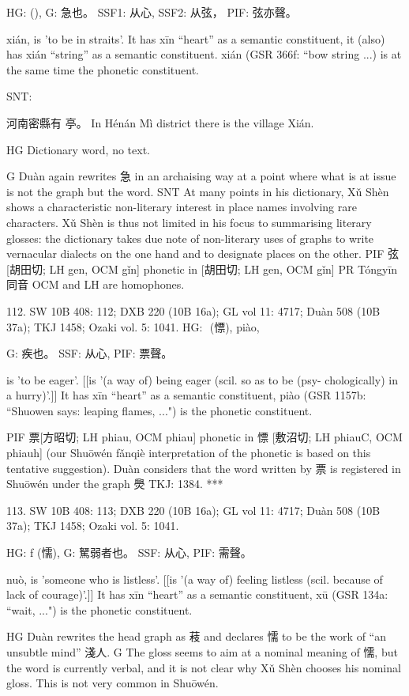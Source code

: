 HG:	(),
G:	急也。
SSF1: 从心,
SSF2: 从弦，
PIF:	弦亦聲。

xián,
is 'to be in straits'.
It has xīn ``heart'' as a semantic constituent,
it (also) has xián ``string'' as a semantic constituent. xián (GSR 366f: ``bow string ...) is at the same time the phonetic constituent.

SNT:

河南密縣有	亭。 In Hénán Mì district there is the village Xián.

HG Dictionary word, no text.



G Duàn again rewrites 急 in an archaising way at a point where what is at issue is not the graph but the word.
SNT At many points in his dictionary, Xǔ Shèn shows a characteristic non-literary interest in place names involving rare characters. Xǔ Shèn is thus not limited in his focus to summarising literary glosses: the dictionary takes due note of non-literary uses of graphs to write vernacular dialects on the one hand and to designate places on the other.
PIF     弦[胡田切; LH gen, OCM gǐn] phonetic in	[胡田切; LH gen, OCM gǐn]
PR	Tóngyīn 同音 OCM and LH are homophones.

112. SW 10B 408: 112; DXB 220 (10B 16a); GL vol 11: 4717; Duàn 508 (10B 37a); TKJ 1458; Ozaki vol. 5: 1041.
HG:  (慓), piào,

G:	疾也。
SSF: 从心,
PIF: 票聲。

is 'to be eager'. [[is '(a way of) being eager (scil. so as to be (psy- chologically) in a hurry)'.]]
It has xīn ``heart'' as a semantic constituent,
piào (GSR 1157b: ``Shuowen says: leaping flames, ...") is the phonetic constituent.

PIF     票[方昭切; LH phiau, OCM phiau] phonetic in 慓 [敷沼切; LH phiauC, OCM phiauh] (our
Shuōwén fǎnqiè interpretation of the phonetic is based on this tentative suggestion).
    Duàn considers that the word written by 票 is registered in Shuōwén under the graph 爂 TKJ: 1384.
***

113. SW 10B 408: 113; DXB 220 (10B 16a); GL vol 11: 4717; Duàn 508 (10B 37a); TKJ 1458; Ozaki vol. 5: 1041.

HG: ƒ (懦),
G:	駑弱者也。
SSF: 从心,
PIF: 需聲。


nuò,
is 'someone who is listless'. [[is '(a way of) feeling listless (scil. because of lack of courage)'.]]
It has xīn ``heart'' as a semantic constituent,
xū (GSR 134a: ``wait, ...") is the phonetic constituent.

HG     Duàn rewrites the head graph as 䓩 and declares 懦 to be the work of ``an unsubtle mind'' 淺人.
G	The gloss seems to aim at a nominal meaning of 懦, but the word is currently verbal, and it is not clear why Xǔ Shèn chooses his nominal gloss. This is not very common in Shuōwén.



